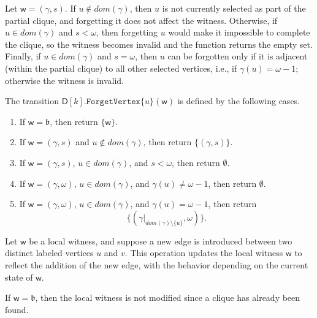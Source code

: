 \documentclass[11pt,a4paper]{article}
\newcommand{\treewidthvalue}{k}
\newcommand{\forgetvertextype}[1]{\mathtt{ForgetVertex}\{#1\}}
\newcommand{\vertexone}{u}
\newcommand{\vertextwo}{v}
\newcommand{\awitness}{\mathsf{w}}
\newcommand{\dpcore}{\mathsf{D}}
\newcommand{\domain}{dom}
\newcommand{\cliqueparameter}{\omega}
\newcommand{\cliquemap}{\gamma}
\newcommand{\cliquesize}{s}
\newcommand{\cliquefound}{\mathfrak{b}}
\begin{document}
{		Let \(\awitness = (\cliquemap,\cliquesize)\). If $\vertexone\notin \domain(\cliquemap)$, then $\vertexone$ is not currently selected as part of the partial clique, and forgetting it does not affect the witness. Otherwise, if $\vertexone\in \domain(\cliquemap)$ and $\cliquesize < \cliqueparameter$, then forgetting $\vertexone$ would make it impossible to complete the clique, so the witness becomes invalid and the function returns the empty set. Finally, if $\vertexone\in \domain(\cliquemap)$ and $\cliquesize = \cliqueparameter$, then $\vertexone$ can be forgotten only if it is adjacent (within the partial clique) to all other selected vertices, i.e., if $\cliquemap(\vertexone)=\cliqueparameter-1$; otherwise the witness is invalid.

				The transition $\dpcore[\treewidthvalue].\forgetvertextype{\vertexone}(\awitness)$ is defined by the following cases.
				\begin{enumerate}
				\item If $\awitness=\cliquefound$, then return $\{\awitness\}$.
				\item If $\awitness=(\cliquemap,\cliquesize)$ and $\vertexone\notin\domain(\cliquemap)$, then return $\{(\cliquemap,\cliquesize)\}$.
				\item If $\awitness=(\cliquemap,\cliquesize)$, $\vertexone\in\domain(\cliquemap)$, and $\cliquesize<\cliqueparameter$, then return $\emptyset$.
				\item If $\awitness=(\cliquemap,\cliqueparameter)$, $\vertexone\in\domain(\cliquemap)$, and $\cliquemap(\vertexone)\neq\cliqueparameter-1$, then return $\emptyset$.
				\item If $\awitness=(\cliquemap,\cliqueparameter)$, $\vertexone\in\domain(\cliquemap)$, and $\cliquemap(\vertexone)=\cliqueparameter-1$, then return
				\[
				\{(\cliquemap|_{\domain(\cliquemap)\setminus \{\vertexone\}},\cliqueparameter)\}.
				\]
				\end{enumerate}

	 Let $\awitness$ be a local witness, and suppose a new edge is introduced between two distinct labeled vertices $\vertexone$ and $\vertextwo$. This operation updates the local witness \(\awitness\) to reflect the addition of the new edge, with the behavior depending on the current state of \(\awitness\).

	If \(\awitness = \cliquefound\), then the local witness is not modified since a clique has already been found.

}
\end{document}
